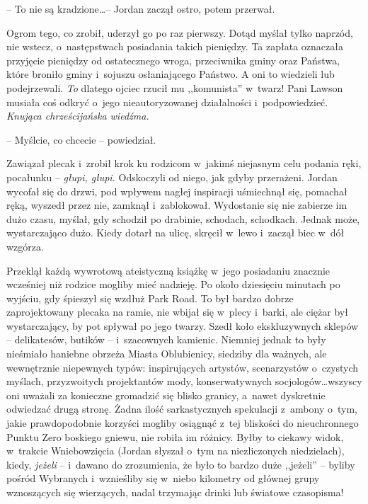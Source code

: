 \documentclass[oneside,polish,11pt,sfheadings]{mwbk}
\begin{document}
-- To nie są kradzione\ldots -- Jordan zaczął ostro, potem przerwał.

Ogrom tego, co zrobił, uderzył go po raz pierwszy. Dotąd myślał tylko
naprzód, nie wstecz, o~następstwach posiadania takich pieniędzy. Ta
zapłata oznaczała przyjęcie pieniędzy od ostatecznego wroga, przeciwnika
gminy oraz Państwa, które broniło gminy i~sojuszu osłaniającego Państwo.
A oni to wiedzieli lub podejrzewali. \emph{To} dlatego ojciec rzucił mu
,,komunista'' w~twarz! Pani Lawson musiała coś odkryć o~jego
nieautoryzowanej działalności i~podpowiedzieć. \emph{Knująca
chrześcijańska wiedźma.}

-- Myślcie, co chcecie -- powiedział.

Zawiązał plecak i~zrobił krok ku rodzicom w~jakimś niejasnym celu
podania ręki, pocałunku -- \emph{głupi, głupi.} Odskoczyli od niego, jak
gdyby przerażeni. Jordan wycofał się do drzwi, pod wpływem nagłej
inspiracji uśmiechnął się, pomachał ręką, wyszedł przez nie, zamknął i~zablokował. Wydostanie się nie zabierze im dużo czasu, myślał, gdy
schodził po drabinie, schodach, schodkach. Jednak może, wystarczająco
dużo. Kiedy dotarł na ulicę, skręcił w~lewo i~zaczął biec w~dół wzgórza.

Przeklął każdą wywrotową ateistyczną książkę w~jego posiadaniu znacznie
wcześniej niż rodzice mogliby mieć nadzieję. Po około dziesięciu
minutach po wyjściu, gdy śpieszył się wzdłuż Park Road. To był bardzo
dobrze zaprojektowany plecaka na ramie, nie wbijał się w~plecy i~barki,
ale ciężar był wystarczający, by pot spływał po jego twarzy. Szedł koło
ekskluzywnych sklepów -- delikatesów, butików -- i~szacownych kamienic.
Niemniej jednak to były nieśmiało haniebne obrzeża Miasta Oblubienicy,
siedziby dla ważnych, ale wewnętrznie niepewnych typów: inspirujących
artystów, scenarzystów o~czystych myślach, przyzwoitych projektantów
mody, konserwatywnych socjologów\ldots wszyscy oni uważali za konieczne
gromadzić się blisko granicy, a~nawet dyskretnie odwiedzać drugą stronę.
Żadna ilość sarkastycznych spekulacji z~ambony o~tym, jakie
prawdopodobnie korzyści mogliby osiągnąć z~tej bliskości do
nieuchronnego Punktu Zero boskiego gniewu, nie robiła im różnicy. Byłby
to ciekawy widok, w~trakcie Wniebowzięcia (Jordan słyszał o~tym na
niezliczonych niedzielach), kiedy, \emph{jeżeli} -- i~dawano do
zrozumienia, że było to bardzo duże ,,jeżeli'' -- byliby pośród Wybranych i~wznieśliby się w~niebo kilometry od głównej grupy wznoszących się
wierzących, nadal trzymając drinki lub światowe czasopisma!
\end{document}
